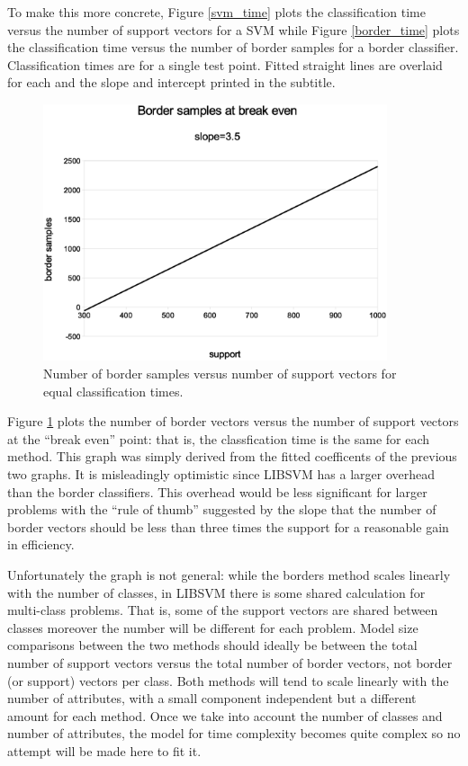 \documentclass[11pt]{article}
\begin{document}
To make this more concrete, Figure \ref{svm_time}
plots the classification time versus the number of support vectors
for a SVM
while Figure \ref{border_time} plots the classification time
versus the number of border samples for a border classifier.
Classification times are for a single test point.
Fitted straight lines are overlaid for each and the slope and intercept 
printed in the subtitle.

\begin{figure}
\includegraphics[width=0.9\textwidth]{break_even}
\caption{Number of border samples versus number of support vectors for equal classification times.}
\label{break_even}
\end{figure}

Figure \ref{break_even} plots the number of border vectors versus the number
of support vectors at the ``break even'' point: that is, the classfication
time is the same for each method.
This graph was simply derived from the fitted coefficents of the previous
two graphs.
It is misleadingly optimistic
since LIBSVM has a larger overhead than the border classifiers.
This overhead would be less significant for larger problems 
with the ``rule of thumb'' suggested by the slope 
that the number of border vectors should be less than three times the support
for a reasonable gain in efficiency.

Unfortunately the graph is not general: while the borders method scales linearly with
the number of classes, in LIBSVM there is some shared calculation for multi-class problems.
That is, some of the support vectors are shared between classes moreover the number will be different for each problem.
Model size comparisons between the two methods should ideally be between the total 
number of support vectors versus the total number of border vectors, not border (or support) vectors per class.
Both methods will tend to scale linearly with the number of attributes, with a small
component independent but a different amount for each method.
Once we take into account the number of classes and number of attributes, the
model for time complexity becomes quite complex so no attempt will be made here
to fit it.
\end{document}
